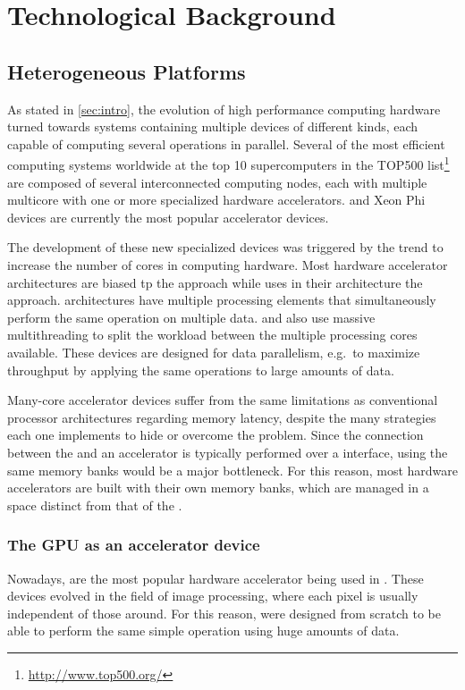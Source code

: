 \section{Technological Background}

\subsection{Heterogeneous Platforms}
As stated in \cref{sec:intro}, the evolution of high performance computing hardware turned towards systems containing multiple devices of different kinds, each capable of computing several operations in parallel. Several of the most efficient computing systems worldwide at the top 10 supercomputers in the TOP500 list\footnote{\url{http://www.top500.org/}} are composed of several interconnected computing nodes, each with multiple multicore \cpus with one or more specialized hardware accelerators. \gpus and \intel Xeon Phi devices are currently the most popular accelerator devices.

The development of these new specialized devices was triggered by the trend to increase the number of cores in computing hardware. Most hardware accelerator architectures are biased tp the \simd approach while \nvidia uses in their \gpu architecture the \simt approach. \simd architectures have multiple processing elements that simultaneously perform the same operation on multiple data. \mics and \gpus also use massive multithreading to split the workload between the multiple processing cores available. These devices are designed for data parallelism, e.g.\ to maximize throughput by applying the same operations to large amounts of data.

Many-core accelerator devices suffer from the same limitations as conventional processor architectures regarding memory latency, despite the many strategies each one implements to hide or overcome the problem. Since the connection between the \cpu and an accelerator is typically performed over a \pcie interface, using the same memory banks would be a major bottleneck. For this reason, most hardware accelerators are built with their own memory banks, which are managed in a space distinct from that of the \cpu.

\subsubsection{The \acs{GPU} as an accelerator device}
Nowadays, \gpus are the most popular hardware accelerator being used in \hpc. These devices evolved in the field of image processing, where each pixel is usually independent of those around. For this reason, \gpus were designed from scratch to be able to perform the same simple operation using huge amounts of data.

